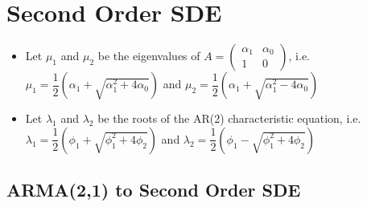 \documentclass[12pt]{article}
\begin{document}
\section{Second Order SDE}

\begin{itemize}
\item Let $\mu_{1}$ and $\mu_{2}$ be the eigenvalues of $A = \left(\begin{array}{cc} \alpha_{1} & \alpha_{0} \\ 1 & 0 \end{array} \right)$, i.e. $\mu_{1} = \dfrac{1}{2} \left(\alpha_{1} + \sqrt{\alpha_{1}^{2} + 4\alpha_{0}}\right)$ and $\mu_{2} = \dfrac{1}{2} \left(\alpha_{1} + \sqrt{\alpha_{1}^{2} - 4\alpha_{0}}\right)$
\item Let $\lambda_{1}$ and $\lambda_{2}$ be the roots of the AR(2) characteristic equation, i.e. $\lambda_{1} = \dfrac{1}{2} \left( \phi_{1} + \sqrt{\phi_{1}^{2} + 4\phi_{2}} \right)$ and $\lambda_{2} = \dfrac{1}{2} \left( \phi_{1} - \sqrt{\phi_{1}^{2} + 4\phi_{2}} \right)$
\end{itemize}

\subsection{ARMA(2,1) to Second Order SDE}

%
%
%
\end{document}
